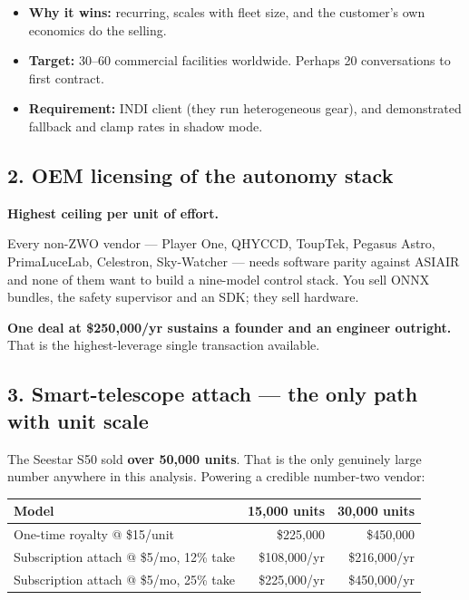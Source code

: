 \documentclass[11pt]{article}
\newcommand{\dollar}[1]{\$#1}
\begin{document}
\begin{itemize}[leftmargin=1.4em,itemsep=2pt]
  \item \textbf{Why it wins:} recurring, scales with fleet size, and the
        customer's own economics do the selling.
  \item \textbf{Target:} 30--60 commercial facilities worldwide. Perhaps 20
        conversations to first contract.
  \item \textbf{Requirement:} INDI client (they run heterogeneous gear), and
        demonstrated fallback and clamp rates in shadow mode.
\end{itemize}

\subsection{2. OEM licensing of the autonomy stack}

\textbf{Highest ceiling per unit of effort.}

Every non-ZWO vendor --- Player One, QHYCCD, ToupTek, Pegasus Astro,
PrimaLuceLab, Celestron, Sky-Watcher --- needs software parity against ASIAIR
and none of them want to build a nine-model control stack. You sell ONNX
bundles, the safety supervisor and an SDK; they sell hardware.

\textbf{One deal at \dollar{250{,}000}/yr sustains a founder and an engineer
outright.} That is the highest-leverage single transaction available.

\subsection{3. Smart-telescope attach --- the only path with unit scale}

The Seestar S50 sold \textbf{over 50,000 units}. That is the only genuinely
large number anywhere in this analysis. Powering a credible number-two vendor:

\begin{center}
\small
\begin{tabular}{@{}lrr@{}}
\toprule
\textbf{Model} & \textbf{15,000 units} & \textbf{30,000 units} \\
\midrule
One-time royalty @ \dollar{15}/unit & \dollar{225{,}000} & \dollar{450{,}000} \\
Subscription attach @ \dollar{5}/mo, 12\% take & \dollar{108{,}000}/yr & \dollar{216{,}000}/yr \\
Subscription attach @ \dollar{5}/mo, 25\% take & \dollar{225{,}000}/yr & \dollar{450{,}000}/yr \\
\bottomrule
\end{tabular}
\end{center}
\end{document}
